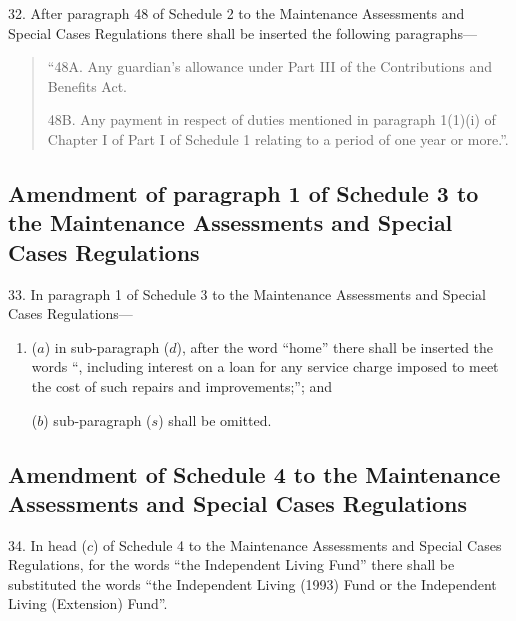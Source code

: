 \documentclass[12pt,a4paper]{article}
\begin{document}
32.  After paragraph 48 of Schedule 2 to the Maintenance Assessments and Special Cases Regulations there shall be inserted the following paragraphs---
\begin{quotation}
“48A.  Any guardian’s allowance under Part III of the Contributions and Benefits Act. 

\medskip

48B. Any payment in respect of duties mentioned in paragraph 1(1)(i) of Chapter I of Part I of Schedule 1 relating to a period of one year or more.”.
\end{quotation}

\subsection[33. Amendment of paragraph 1 of Schedule 3 to the Maintenance Assessments and Special Cases Regulations]{Amendment of paragraph 1 of Schedule 3 to the Maintenance Assessments and Special Cases Regulations}

33.  In paragraph 1 of Schedule 3 to the Maintenance Assessments and Special Cases Regulations---
\begin{enumerate}\item[]
($a$) in sub-paragraph ($d$), after the word “home” there shall be inserted the words “, including interest on a loan for any service charge imposed to meet the cost of such repairs and improvements;”; and

($b$) sub-paragraph ($s$) shall be omitted.
\end{enumerate}

\subsection[34. Amendment of Schedule 4 to the Maintenance Assessments and Special Cases Regulations]{Amendment of Schedule 4 to the Maintenance Assessments and Special Cases Regulations}

34.  In head ($c$) of Schedule 4 to the Maintenance Assessments and Special Cases Regulations, for the words “the Independent Living Fund” there shall be substituted the words “the Independent Living (1993) Fund or the Independent Living (Extension) Fund”.

\end{document}
